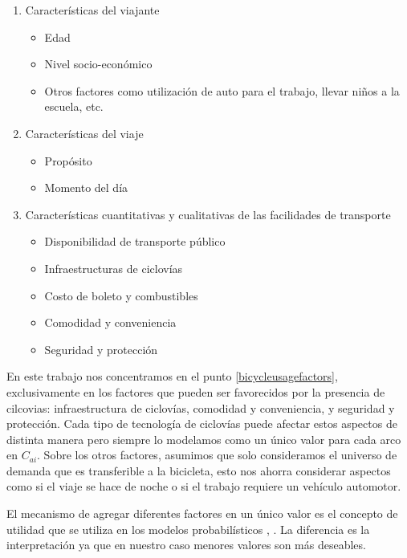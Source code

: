 \documentclass{article}
\begin{document}
  \begin{enumerate}
    \item{
        Características del viajante
          \begin{itemize}
            \item{Edad}
            \item{Nivel socio-económico}
            \item{Otros factores como utilización de auto para el trabajo, llevar niños a la escuela, etc.}
          \end{itemize}
    }
    \item{
        Características del viaje
          \begin{itemize}
            \item{Propósito}
            \item{Momento del día}
          \end{itemize}
    }
  \item{\label{bicycleusagefactors}
        Características cuantitativas y cualitativas de las facilidades de transporte
        \begin{itemize}
            \item{Disponibilidad de transporte público}
            \item{Infraestructuras de ciclovías}
            \item{Costo de boleto y combustibles}
            \item{Comodidad y conveniencia}
            \item{Seguridad y protección}
        \end{itemize}
    }
  \end{enumerate}

  En este trabajo nos concentramos en el punto \ref{bicycleusagefactors}, exclusivamente en los factores que pueden ser favorecidos por la presencia de cilcovias: infraestructura de ciclovías, comodidad y conveniencia, y seguridad y protección. Cada tipo de tecnología de ciclovías puede afectar estos aspectos de distinta manera pero siempre lo modelamos como un único valor para cada arco en $C_{ai}$. Sobre los otros factores, asumimos que solo consideramos el universo de demanda que es transferible a la bicicleta, esto nos ahorra considerar aspectos como si el viaje se hace de noche o si el trabajo requiere un vehículo automotor.

  El mecanismo de agregar diferentes factores en un único valor es el concepto de utilidad que se utiliza en los modelos probabilísticos \cite{ortuz2011}, \cite{Pacheco2021}. La diferencia es la interpretación ya que en nuestro caso menores valores son más deseables.
\end{document}
